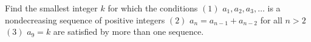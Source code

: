 Find the smallest integer $k$ for which the conditions
$(1)$ $a_1, a_2, a_3, \ldots$ is a nondecreasing sequence of positive integers
$(2)$ $a_n=a_{n-1}+a_{n-2}$ for all $n>2$
$(3)$ $a_9=k$
are satisfied by more than one sequence.